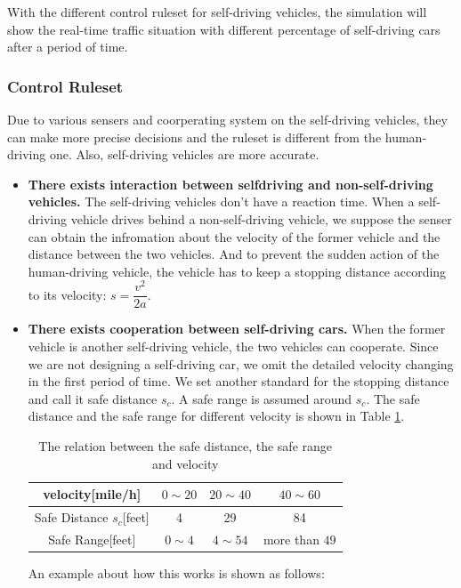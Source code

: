\documentclass[a4paper]{article}
\begin{document}
	With the different control ruleset for self-driving vehicles, the simulation will show the real-time traffic situation with different percentage of self-driving cars after a period of time.

	\subsubsection{Control Ruleset}
	Due to various sensers and coorperating system on the self-driving vehicles, they can make more precise decisions and the ruleset is different from the human-driving one. Also, self-driving vehicles are more accurate.
	\begin{itemize}
		\item \textbf{There exists interaction between selfdriving
		and non-self-driving vehicles.} The self-driving vehicles don't have a reaction time. When a self-driving vehicle drives behind a non-self-driving vehicle, we suppose the senser can obtain the infromation about the velocity of the former vehicle and the distance between the two vehicles. And to prevent the sudden action of the human-driving vehicle, the vehicle has to keep a stopping distance according to its velocity: $ s=\dfrac{v^2}{2a} $.
		\item \textbf{There exists cooperation between self-driving cars.} When the former vehicle is another self-driving vehicle, the two vehicles can cooperate. Since we are not designing a self-driving car, we omit the detailed velocity changing in the first period of time. We set another standard for the stopping distance and call it safe distance $ s_c $. A safe range is assumed around $ s_c $. The safe distance and the safe range for different velocity is shown in Table \ref{range}.

		\begin{table}[H]
			\centering
			\begin{tabular}{cccc}
				\toprule
				velocity[mile/h] & $ 0\sim20 $  & $ 20\sim40 $ & $ 40\sim60 $ \\
				\midrule
				Safe Distance $ s_c $[feet]  & 4     & 29    & 84 \\
				Safe Range[feet] & $ 0\sim4 $  & $ 4\sim54 $ & more than $ 49 $ \\
				\bottomrule
			\end{tabular}%
			\caption{The relation between the safe distance, the safe range and velocity}
			\label{range}%
		\end{table}%

		An example about how this works is shown as follows:


\end{itemize}
\end{document}

